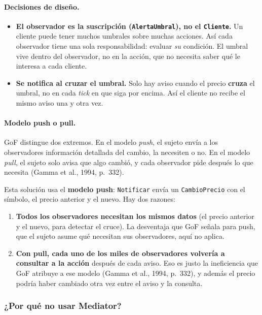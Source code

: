 \paragraph{Decisiones de diseño.}
\begin{itemize}
  \item \textbf{El observador es la suscripción (\texttt{AlertaUmbral}), no el
        \texttt{Cliente}.} Un cliente puede tener muchos umbrales sobre muchas acciones. Así
        cada observador tiene una sola responsabilidad: evaluar \emph{su} condición. El umbral
        vive dentro del observador, no en la acción, que no necesita saber qué le interesa a
        cada cliente.
  \item \textbf{Se notifica al cruzar el umbral.} Solo hay aviso cuando el precio
        \textbf{cruza} el umbral, no en cada \emph{tick} en que siga por encima. Así el cliente
        no recibe el mismo aviso una y otra vez.
\end{itemize}

\paragraph{Modelo push o pull.}
GoF distingue dos extremos. En el modelo \emph{push}, el sujeto envía a los observadores
información detallada del cambio, la necesiten o no. En el modelo \emph{pull}, el sujeto solo
avisa que algo cambió, y cada observador pide después lo que necesita
(Gamma et al., 1994, p.~332).

Esta solución usa el \textbf{modelo push}: \texttt{Notificar} envía un \texttt{CambioPrecio}
con el símbolo, el precio anterior y el nuevo. Hay dos razones:

\begin{enumerate}
  \item \textbf{Todos los observadores necesitan los mismos datos} (el precio anterior y el
        nuevo, para detectar el cruce). La desventaja que GoF señala para push, que el sujeto
        asume qué necesitan sus observadores, aquí no aplica.
  \item \textbf{Con pull, cada uno de los miles de observadores volvería a consultar a la
        acción} después de cada aviso. Eso es justo la ineficiencia que GoF atribuye a ese
        modelo (Gamma et al., 1994, p.~332), y además el precio podría haber cambiado otra vez
        entre el aviso y la consulta.
\end{enumerate}

\subsubsection{¿Por qué no usar Mediator?}

